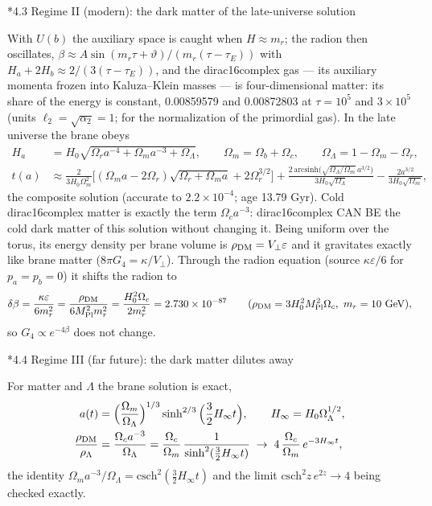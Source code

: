 \documentclass[10pt,a4paper]{article}
\makeatletter
\renewcommand\subsection{\@startsection{subsection}{2}{\z@}{-3.25ex\@plus -1ex \@minus -.2ex}{1.5ex \@plus .2ex}{\normalfont\large\bfseries\raggedright}}
\makeatother
\begin{document}
\subsection*{4.3 Regime II (modern): the dark matter of the late-universe solution}
With $U(b)$ the auxiliary space is caught when $H\approx m_r$; the radion then oscillates, $\beta\approx A\sin(m_r\tau+\vartheta)/(m_r(\tau-\tau_E))$ with $H_a+2H_b\approx2/(3(\tau-\tau_E))$, and the dirac16complex gas — its auxiliary momenta frozen into Kaluza–Klein masses — is four-dimensional matter: its share of the energy is constant, 0.00859579 and 0.00872803 at $\tau=10^5$ and $3\times10^5$ (units $\ell_2=\sqrt{\alpha_2}=1$; for the normalization of the primordial gas). In the late universe the brane obeys
\begin{align*}
H_a&=H_0\sqrt{\Omega_ra^{-4}+\Omega_ma^{-3}+\Omega_\Lambda},\qquad \Omega_m=\Omega_b+\Omega_c,\qquad \Omega_\Lambda=1-\Omega_m-\Omega_r, \\
t(a)&\approx\frac{2}{3H_0\Omega_m^2}\Big[(\Omega_ma-2\Omega_r)\sqrt{\Omega_r+\Omega_ma}+2\Omega_r^{3/2}\Big]+\frac{2\,\mathrm{arcsinh}\big(\sqrt{\Omega_\Lambda/\Omega_m}\,a^{3/2}\big)}{3H_0\sqrt{\Omega_\Lambda}}-\frac{2a^{3/2}}{3H_0\sqrt{\Omega_m}},
\end{align*}
the composite solution (accurate to $2.2\times10^{-4}$; age 13.79 Gyr). Cold dirac16complex matter is exactly the term $\Omega_ca^{-3}$: dirac16complex CAN BE the cold dark matter of this solution without changing it. Being uniform over the torus, its energy density per brane volume is $\rho_{\rm DM}=V_\perp\varepsilon$ and it gravitates exactly like brane matter ($8\pi G_4=\kappa/V_\perp$). Through the radion equation (source $\kappa\varepsilon/6$ for $p_a=p_b=0$) it shifts the radion to
\begin{equation*}
\delta\beta=\frac{\kappa\varepsilon}{6m_r^2}=\frac{\rho_{\rm DM}}{6M_{\rm Pl}^2m_r^2}=\frac{H_0^2\Omega_c}{2m_r^2}=2.730\times10^{-87}\qquad(\rho_{\rm DM}=3H_0^2M_{\rm Pl}^2\Omega_c,\ m_r=10\ \text{GeV}),
\end{equation*}
so $G_4\propto e^{-4\beta}$ does not change.

\subsection*{4.4 Regime III (far future): the dark matter dilutes away}
For matter and $\Lambda$ the brane solution is exact,
\begin{align*}
a(t)&=\Big(\frac{\Omega_m}{\Omega_\Lambda}\Big)^{1/3}\sinh^{2/3}\Big(\frac32H_\infty t\Big),\qquad H_\infty=H_0\Omega_\Lambda^{1/2}, \\
\frac{\rho_{\rm DM}}{\rho_\Lambda}&=\frac{\Omega_ca^{-3}}{\Omega_\Lambda}=\frac{\Omega_c}{\Omega_m}\,\frac1{\sinh^2(\frac32H_\infty t)}\;\to\;4\,\frac{\Omega_c}{\Omega_m}\,e^{-3H_\infty t},
\end{align*}
the identity $\Omega_ma^{-3}/\Omega_\Lambda=\mathrm{csch}^2(\frac32H_\infty t)$ and the limit $\mathrm{csch}^2z\,e^{2z}\to4$ being checked exactly.
\end{document}
